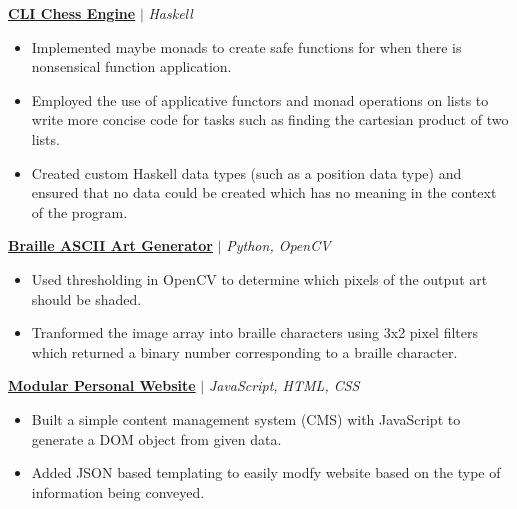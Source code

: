 \documentclass{article}
\newcommand{\smallbullet}{\,\begin{picture}(-1,1)(-1,-3)\circle*{3}\end{picture}\ }
\newenvironment{resumeItem}
{
    \vspace{0.5em}
}
{
}
\newcommand{\projectHead}[3]{
    \textbf{#1} $\vert$ \textit{#2} \\[-1.2em]
}
\newenvironment{resumeList}
{
    \begin{itemize}[label=\smallbullet]
}
{
    \end{itemize}
}
\begin{document}
\begin{resumeItem}
\projectHead{\href{https://github.com/arnavcs/cli-chess-engine}{CLI Chess Engine}}{Haskell}{Aug 2022 - Present}
\begin{resumeList}
    \item Implemented maybe monads to create safe functions for when there is nonsensical function application.
    \item Employed the use of applicative functors and monad operations on lists to write more concise code for tasks such as finding the cartesian product of two lists.
    \item Created custom Haskell data types (such as a position data type) and ensured that no data could be created which has no meaning in the context of the program.
\end{resumeList}
\end{resumeItem}


\begin{resumeItem}
\projectHead{\href{https://github.com/arnavcs/ASCII-art}{Braille ASCII Art Generator}}{Python, OpenCV}{Apr 2021 - Jul 2021}
\begin{resumeList}
    \item Used thresholding in OpenCV to determine which pixels of the output art should be shaded.
    \item Tranformed the image array into braille characters using 3x2 pixel filters which returned a binary number corresponding to a braille character.
\end{resumeList}
\end{resumeItem}

\begin{resumeItem}
\projectHead{\href{https://github.com/arnavcs/arnavcs.github.io}{Modular Personal Website}}{JavaScript, HTML, CSS}{Mar 2022 - Aug 2022}
\begin{resumeList}
    \item Built a simple content management system (CMS) with JavaScript to generate a DOM object from given data.
    \item Added JSON based templating to easily modfy website based on the type of information being conveyed.
\end{resumeList}
\end{resumeItem}
\end{document}
